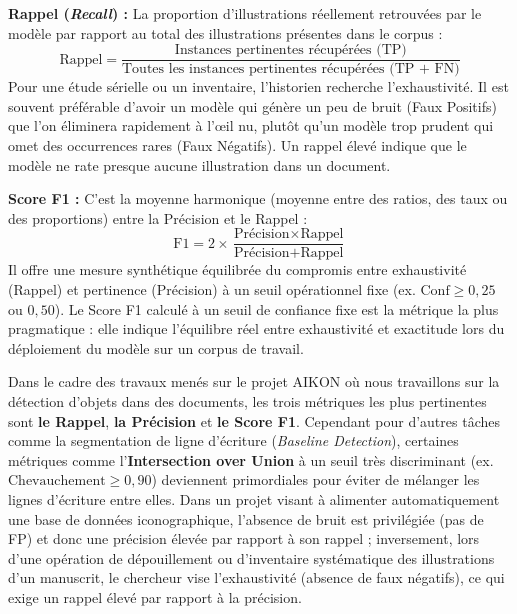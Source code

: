 \begin{description}
        \item \textbf{Rappel (\textit{Recall}) :} La proportion d'illustrations réellement retrouvées par le modèle par rapport au total des illustrations présentes dans le corpus :
        \begin{equation*}
            \text{Rappel} = \frac{\text{Instances pertinentes récupérées (TP)}}{\text{Toutes les instances pertinentes récupérées (TP + FN)}}
        \end{equation*}
        Pour une étude sérielle ou un inventaire, l'historien recherche l'exhaustivité. Il est souvent préférable d'avoir un modèle qui génère un peu de \og bruit \fg{} (Faux Positifs) que l'on éliminera rapidement à l'œil nu, plutôt qu'un modèle trop prudent qui omet des occurrences rares (Faux Négatifs). Un rappel élevé indique que le modèle ne rate presque aucune illustration dans un document.

        \item \textbf{Score F1 :} C'est la moyenne harmonique (moyenne entre des ratios, des taux ou des proportions) entre la Précision et le Rappel :
        \begin{equation*}
            \text{F1} = 2 \times \frac{\text{Précision} \times \text{Rappel}}{\text{Précision} + \text{Rappel}}
        \end{equation*}
        Il offre une mesure synthétique équilibrée du compromis entre exhaustivité (Rappel) et pertinence (Précision) à un seuil opérationnel fixe (ex. $\text{Conf} \ge 0{,}25$ ou $0{,}50$). Le Score F1 calculé à un seuil de confiance fixe est la métrique la plus pragmatique : elle indique l'équilibre réel entre exhaustivité et exactitude lors du déploiement du modèle sur un corpus de travail.
\end{description}

Dans le cadre des travaux menés sur le projet AIKON où nous travaillons sur la détection d'objets dans des documents, les trois métriques les plus pertinentes sont \textbf{le Rappel}, \textbf{la Précision} et \textbf{le Score F1}. Cependant pour d'autres tâches comme la segmentation de ligne d'écriture (\textit{Baseline Detection}), certaines métriques comme l'\textbf{Intersection over Union} à un seuil très discriminant (ex. $\text{Chevauchement} \ge 0{,}90$) deviennent primordiales pour éviter de mélanger les lignes d'écriture entre elles. Dans un projet visant à alimenter automatiquement une base de données iconographique, l'absence de bruit est privilégiée (pas de FP) et donc une précision élevée par rapport à son rappel ; inversement, lors d'une opération de dépouillement ou d'inventaire systématique des illustrations d'un manuscrit, le chercheur vise l'exhaustivité (absence de faux négatifs), ce qui exige un rappel élevé par rapport à la précision.

